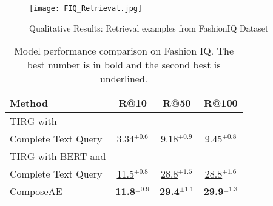 \begin{figure*}
\centering
\texttt{[image: FIQ\_Retrieval.jpg]}
\caption{Qualitative Results: Retrieval examples from FashionIQ Dataset}
\label{fig:fIQqual}
\end{figure*}


\begin{table}[ht]

\centering
\begin{tabular}{|l|ccc|}
\hline
Method & R@10 & R@50 & R@100 \\
\hline\hline
TIRG with &  &  & \\ Complete Text Query & 3.34$^{\pm0.6}$  & 9.18$^{\pm0.9}$  &  9.45$^{\pm0.8}$ \\
\hline
TIRG with BERT and &  &  & \\ Complete Text Query & \underline{11.5}$^{\pm0.8}$ & \underline{28.8}$^{\pm1.5}$ & \underline{28.8}$^{\pm1.6}$
\\
\hline
ComposeAE & \textbf{11.8}$^{\pm0.9}$ & \textbf{29.4}$^{\pm1.1}$ & \textbf{29.9}$^{\pm1.3}$ \\

\hline
\end{tabular}

\label{tab:fiq}
\vspace{3mm}
\caption{Model performance comparison on Fashion IQ. The best number is in bold and the second best is underlined.}
\end{table}








%
